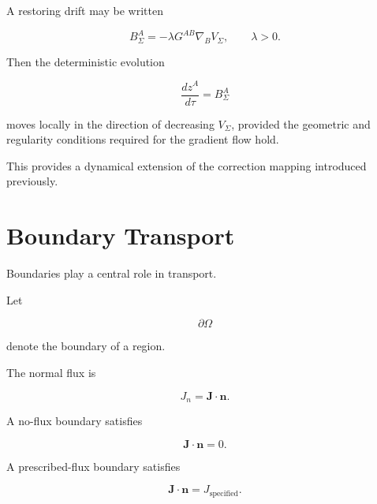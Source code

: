 \documentclass[12pt,oneside]{book}
\begin{document}
A restoring drift may be written

\begin{equation}
    B_{\Sigma}^A
    =
    -
    \lambda
    G^{AB}
    \nabla_B V_{\Sigma},
    \qquad
    \lambda>0.
    \label{eq:restoring-drift}
\end{equation}

Then the deterministic evolution

\begin{equation}
    \frac{dz^A}{d\tau}
    =
    B_{\Sigma}^A
    \label{eq:stability-drift-equation}
\end{equation}

moves locally in the direction of decreasing
\(V_{\Sigma}\), provided the geometric and regularity
conditions required for the gradient flow hold.

This provides a dynamical extension of the correction mapping
introduced previously.


\section{Boundary Transport}
\label{sec:boundary-transport}

Boundaries play a central role in transport.

Let

\begin{equation}
    \partial\Omega
\end{equation}

denote the boundary of a region.

The normal flux is

\begin{equation}
    J_n
    =
    \mathbf{J}\cdot\mathbf{n}.
    \label{eq:normal-flux}
\end{equation}

A no-flux boundary satisfies

\begin{equation}
    \mathbf{J}\cdot\mathbf{n}
    =
    0.
    \label{eq:no-flux-boundary}
\end{equation}

A prescribed-flux boundary satisfies

\begin{equation}
    \mathbf{J}\cdot\mathbf{n}
    =
    J_{\mathrm{specified}}.
    \label{eq:specified-flux-boundary}
\end{equation}
\end{document}
